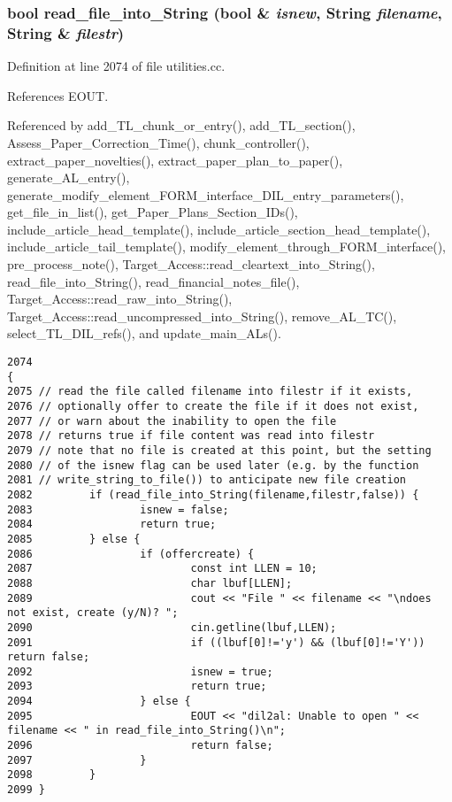 \subsubsection{\setlength{\rightskip}{0pt plus 5cm}bool read\_\-file\_\-into\_\-String (bool \& {\em isnew}, {\bf String} {\em filename}, {\bf String} \& {\em filestr})}\label{utilities_8cc_a39}




Definition at line 2074 of file utilities.cc.

References EOUT.

Referenced by add\_\-TL\_\-chunk\_\-or\_\-entry(), add\_\-TL\_\-section(), Assess\_\-Paper\_\-Correction\_\-Time(), chunk\_\-controller(), extract\_\-paper\_\-novelties(), extract\_\-paper\_\-plan\_\-to\_\-paper(), generate\_\-AL\_\-entry(), generate\_\-modify\_\-element\_\-FORM\_\-interface\_\-DIL\_\-entry\_\-parameters(), get\_\-file\_\-in\_\-list(), get\_\-Paper\_\-Plans\_\-Section\_\-IDs(), include\_\-article\_\-head\_\-template(), include\_\-article\_\-section\_\-head\_\-template(), include\_\-article\_\-tail\_\-template(), modify\_\-element\_\-through\_\-FORM\_\-interface(), pre\_\-process\_\-note(), Target\_\-Access::read\_\-cleartext\_\-into\_\-String(), read\_\-file\_\-into\_\-String(), read\_\-financial\_\-notes\_\-file(), Target\_\-Access::read\_\-raw\_\-into\_\-String(), Target\_\-Access::read\_\-uncompressed\_\-into\_\-String(), remove\_\-AL\_\-TC(), select\_\-TL\_\-DIL\_\-refs(), and update\_\-main\_\-ALs().



\footnotesize\begin{verbatim}2074                                                                             {
2075 // read the file called filename into filestr if it exists,
2076 // optionally offer to create the file if it does not exist,
2077 // or warn about the inability to open the file
2078 // returns true if file content was read into filestr
2079 // note that no file is created at this point, but the setting
2080 // of the isnew flag can be used later (e.g. by the function
2081 // write_string_to_file()) to anticipate new file creation
2082         if (read_file_into_String(filename,filestr,false)) {
2083                 isnew = false;
2084                 return true;
2085         } else {
2086                 if (offercreate) {
2087                         const int LLEN = 10;
2088                         char lbuf[LLEN];
2089                         cout << "File " << filename << "\ndoes not exist, create (y/N)? ";
2090                         cin.getline(lbuf,LLEN);
2091                         if ((lbuf[0]!='y') && (lbuf[0]!='Y')) return false;
2092                         isnew = true;
2093                         return true;
2094                 } else {
2095                         EOUT << "dil2al: Unable to open " << filename << " in read_file_into_String()\n";
2096                         return false;
2097                 }
2098         }
2099 }
\end{verbatim}\normalsize 
{}
